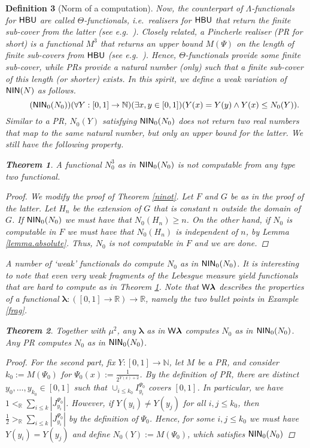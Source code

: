\documentclass[reqno]{amsart}
\newtheorem{thm}{Theorem}
\newtheorem{defi}[thm]{Definition}
\newcommand\be{\begin{equation}}
\newcommand\ee{\end{equation}}
\def\N{{\mathbb  N}}
\def\R{{\mathbb  R}}
\def\di{\rightarrow}
\def\HBU{\textup{\textsf{HBU}}}
\def\WL{\textup{\textsf{W}}{\mathbold\lambda}}
\def\NIN{\textup{\textsf{NIN}}}
\def\blambda{\pmb{\lambda}}
\numberwithin{equation}{section}
\numberwithin{thm}{section}
\begin{document}
\begin{defi}[Norm of a computation]
Now, the counterpart of $\Lambda$-functionals for $\HBU$ are called $\Theta$-functionals, i.e.\ realisers for $\HBU$ that return the finite sub-cover from the latter (see e.g.\ \cite{dagsam, dagsamII, dagsamIII, dagsamV}). 
Closely related, a \emph{Pincherle realiser} (PR for short) is a functional $M^{3}$ that returns an upper bound $M(\Psi)$ on the \emph{length} of finite sub-covers from $\HBU$ (see e.g.\ \cite{dagsamV}).
Hence, $\Theta$-functionals provide some finite sub-cover, while PRs provide a natural number (only) such that a finite sub-cover of this length (or shorter) \emph{exists}.  
In this spirit, we define a weak variation of $\NIN(N)$ as follows. 
\be\tag{$\NIN_{0}(N_{0})$}
(\forall Y:[0,1]\di \N)(\exists x, y\in [0,1])(   Y(x)=Y(y)\wedge Y(x)\leq N_{0}(Y) ).
\ee
Similar to a PR, $N_{0}(Y)$ satisfying $\NIN_{0}(N_{0})$ does not return two real numbers that map to the same natural number, but only an upper bound for the latter.
We still have the following property. 
\begin{thm}\label{Xx}
A functional $N_{0}^{3}$ as in $\NIN_{0}(N_{0})$ is not computable from any type two functional.
\end{thm}
\begin{proof}
We modify the proof of Theorem \ref{ninot}.  Let $F$ and $G$ be as in the proof of the latter. Let $H_n$ be the extension of $G$ that is constant $n$ outside the domain of $G$. If $\NIN_{0}(N_0)$ we must have that $N_0(H_n) \geq n$. On the other hand, if $N_0$ is computable in $F$ we must have that $N_0(H_n)$ is independent of $n$, by Lemma \ref{lemma.absolute}. 
Thus, $N_0$ is not computable in $F$ and we are done.
\end{proof}
A number of `weak' functionals do compute $N_{0}$ as in $\NIN_{0}(N_{0})$.  It is interesting to note that even very weak fragments of the Lebesgue measure
yield functionals that are hard to compute as in Theorem \ref{Xx}.  Note that $\WL$ describes the properties of a functional $\blambda:([0,1]\di \R)\di \R$, namely the two bullet points in Example \ref{frag}.
\begin{thm}
Together with $\mu^{2}$, any $\blambda$ as in $\WL$ computes $N_{0}$ as in $\NIN_{0}(N_{0})$.
Any PR computes $N_{0}$ as in $\NIN_{0}(N_{0})$.
\end{thm}
\begin{proof}
For the second part, fix $Y:[0,1]\di \N$, let $M$ be a PR, and consider $k_{0}:=M(\Psi_{0})$ for $\Psi_{0}(x):= \frac{1}{2^{Y(x)+2}}$. 
By the definition of PR, there are distinct $y_{0}, \dots, y_{k_{0}}\in [0,1]$ such that $\cup_{i\leq k_{0}}I_{y_{i}}^{\Psi_{0}}$ covers $[0,1]$.  
In particular, we have $1<_{\R}\sum_{i\leq k}| J_{y_{i}}^{\Psi_{0}}|$.
However, if $Y(y_{i})\ne Y(y_{j})$ for all $i, j\leq k_{0}$, then $\frac{1}{2}>_{\R}\sum_{i\leq k}| J_{y_{i}}^{\Psi_{0}}|$ by the definition of $\Psi_{0}$.
Hence, for some $i, j\leq k_{0}$ we must have $Y(y_{i})=Y(y_{j})$ and define $N_{0}(Y):=M(\Psi_{0})$, which satisfies $\NIN_{0}(N_{0})$


\end{proof}
\end{defi}
\end{document}
